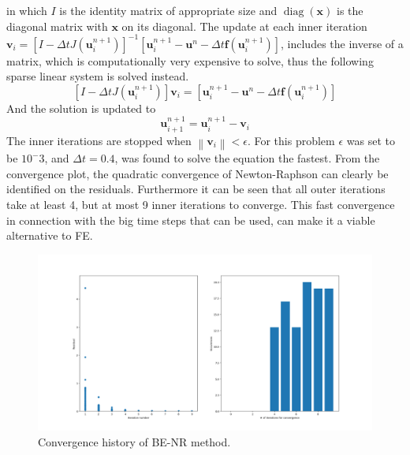 \documentclass{article}
\newcommand{\norm}[1]{\left\lVert#1\right\rVert}
\begin{document}
in which $I$ is the identity matrix of appropriate size and $\operatorname{diag}(\mathbf{x})$ is the diagonal matrix with $\mathbf{x}$ on its diagonal. The update at each inner iteration $\mathbf{v}_i = \left[I-\Delta t J\left(\mathbf{u}_{i}^{n+1}\right)\right]^{-1}\left[\mathbf{u}_{i}^{n+1}-\mathbf{u}^{n}-\Delta t \mathbf{f}\left(\mathbf{u}_{i}^{n+1}\right)\right]$, includes the inverse of a matrix, which is computationally very expensive to solve, thus the following sparse linear system is solved instead.
\begin{equation}
\left[I-\Delta t J\left(\mathbf{u}_{i}^{n+1}\right)\right] \mathbf{v}_i = \left[\mathbf{u}_{i}^{n+1}-\mathbf{u}^{n}-\Delta t \mathbf{f}\left(\mathbf{u}_{i}^{n+1}\right)\right]
\end{equation}
And the solution is updated to
\begin{equation}
	\mathbf{u}^{n+1}_{i+1} = 	\mathbf{u}^{n+1}_{i} - \mathbf{v}_i
\end{equation}
The inner iterations are stopped when $\norm{\mathbf{v}_i} < \epsilon$.
For this problem $\epsilon$ was set to be $10^-3$, and $\Delta t = 0.4$, was found to solve the equation the fastest. From the convergence plot, the quadratic convergence of Newton-Raphson can clearly be identified on the residuals. Furthermore it can be seen that all outer iterations take at least 4, but at most 9 inner iterations to converge. This fast convergence in connection with the big time steps that can be used, can make it a viable alternative to FE.
\begin{figure}[H]
	\centering
	\includegraphics[width=.9\linewidth]{4ConvergenceNewton.png}
	\caption{Convergence history of BE-NR method.}
\end{figure}
\end{document}
